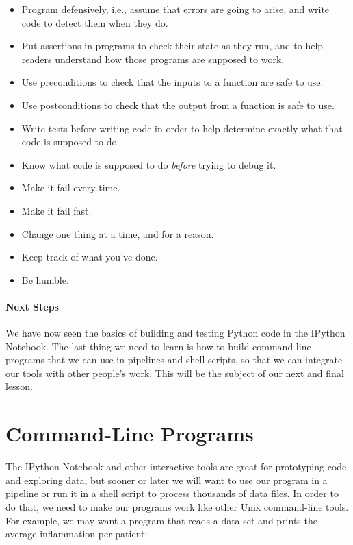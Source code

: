 \documentclass[]{book}
\begin{document}
\begin{itemize}
\item
  Program defensively, i.e., assume that errors are going to arise, and
  write code to detect them when they do.
\item
  Put assertions in programs to check their state as they run, and to
  help readers understand how those programs are supposed to work.
\item
  Use preconditions to check that the inputs to a function are safe to
  use.
\item
  Use postconditions to check that the output from a function is safe to
  use.
\item
  Write tests before writing code in order to help determine exactly
  what that code is supposed to do.
\item
  Know what code is supposed to do \emph{before} trying to debug it.
\item
  Make it fail every time.
\item
  Make it fail fast.
\item
  Change one thing at a time, and for a reason.
\item
  Keep track of what you've done.
\item
  Be humble.
\end{itemize}

\mbox{}\paragraph{Next Steps}

We have now seen the basics of building and testing Python code in the
IPython Notebook. The last thing we need to learn is how to build
command-line programs that we can use in pipelines and shell scripts, so
that we can integrate our tools with other people's work. This will be
the subject of our next and final lesson.

\section{Command-Line Programs}

The IPython Notebook and other interactive tools are great for
prototyping code and exploring data, but sooner or later we will want to
use our program in a pipeline or run it in a shell script to process
thousands of data files. In order to do that, we need to make our
programs work like other Unix command-line tools. For example, we may
want a program that reads a data set and prints the average inflammation
per patient:
\end{document}
